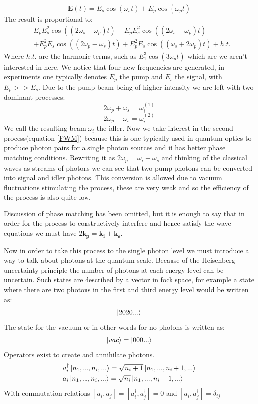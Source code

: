 \begin{equation}
\mathbf{E}(t)=E_s\cos(\omega_st)+E_p\cos(\omega_pt)
\end{equation}
\noindent
The result is proportional to:
\begin{align}
&E_p E_s^2 \cos ((2 {\omega_s}-{\omega_p})t)+E_p E_s^2 \cos ((2 {\omega_s}+{\omega_p})t)\\
&+ E_p^2 E_s \cos ((2{\omega_p}-{\omega_s})t)+ E_p^2 E_s \cos (({\omega_s}+2 \omega_p)t) + h.t.
\end{align}
\noindent
Where $h.t.$ are the harmonic terms, such as $E_1^3\cos(3\omega_p t)$ which are we aren't interested in here. We notice that four new frequencies are generated, in experiments one typically denotes $E_p$ the pump and $E_s$ the signal, with $E_p >> E_s$. Due to the pump beam being of higher intensity we are left with two dominant processes:
\begin{equation}
	2\omega_p+\omega_s = \omega_i^{(1)}
\end{equation}
\begin{equation} \label{FWM}
	2\omega_p-\omega_s = \omega_i^{(2)}
\end{equation}
We call the resulting beam $\omega_i$ the idler. Now we take interest in the second process(equation \ref{FWM}) because this is one typically used in quantum optics to produce photon pairs for a single photon sources and it has better phase matching conditions. Rewriting it as $	2\omega_p = \omega_i+\omega_s$ and thinking of the classical waves as streams of photons we can see that two pump photons can be converted into signal and idler photons. This conversion is allowed due to vacuum fluctuations stimulating the process, these are very weak and so the efficiency of the process is also quite low.

Discussion of phase matching has been omitted, but it is enough to say that in order for the process to constructively interfere and hence satisfy the wave equations we must have $2\mathbf{k_p}=\mathbf{k_i}+\mathbf{k_s}$.


Now in order to take this process to the single photon level we must introduce a way to talk about photons at the quantum scale. Because of the Heisenberg uncertainty principle the number of photons at each energy level can be uncertain. Such states are described by a vector in fock space, for example a state where there are two photons in the first and third energy level would be written as:
\begin{equation}
	\ket{2020...}
\end{equation}
The state for the vacuum or in other words for no photons is written as:
\begin{equation}
	\ket{vac}=\ket{000...}
\end{equation}
Operators exist to create and annihilate photons.
\begin{align}
& a_i^{\dagger}\ket{n_1,...,n_i,...}=\sqrt{n_i+1}\ket{n_1,...,n_i+1,...} \\
& a_i\ket{n_1,...,n_i,...}=\sqrt{n_i}\ket{n_1,...,n_i-1,...} \\
\end{align}
With commutation relations $[a_i,a_j]=[a^{\dagger}_i,a^{\dagger}_j]=0$ and $[a_i,a^{\dagger}_j]=\delta_{ij}$

